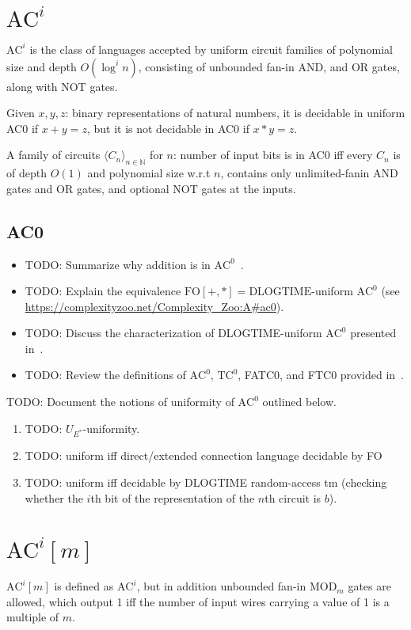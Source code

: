 \section{\texorpdfstring{$\text{AC}^i$}{AC\string^i}}
$\text{AC}^i$ is the class of languages accepted by uniform circuit
families of polynomial size and depth $O(\log^i n)$, consisting of unbounded fan-in
AND, and OR gates, along with NOT gates.

Given $x, y, z$: binary representations of natural numbers,
it is decidable in uniform AC0 if $x + y = z$, but it is not decidable 
in AC0 if $x * y = z$.

A family of circuits $\langle C_n \rangle_{n \in \mathbb{N}}$ for $n$:
number of input bits is in AC0 iff every $C_n$ is of depth $O(1)$ and polynomial 
size w.r.t $n$, contains only unlimited-fanin AND gates and OR gates, and optional 
NOT gates at the inputs. 

\subsection{AC0}
\begin{itemize}
\item TODO: Summarize why addition is in $\text{AC}^0$~\cite{BussLectureNotes}.
\item TODO: Explain the equivalence $\text{FO}[+, *] = \text{DLOGTIME}$-uniform $\text{AC}^0$ (see \url{https://complexityzoo.net/Complexity_Zoo:A#ac0}).
\item TODO: Discuss the characterization of DLOGTIME-uniform $\text{AC}^0$ presented in~\cite{hella2023regularrepresentationsuniformtc0}.
\item TODO: Review the definitions of $\text{AC}^0$, $\text{TC}^0$, FATC0, and FTC0 provided in~\cite{612309}.
\end{itemize}
TODO: Document the notions of uniformity of $\text{AC}^0$ outlined below.
\begin{enumerate}
\item TODO: $U_{E^*}$-uniformity.
\item TODO: uniform iff direct/extended connection language decidable by FO 
\item TODO: uniform iff decidable by DLOGTIME random-access tm (checking whether the $i$th bit of the representation of the $n$th circuit is $b$).
\end{enumerate}



\section{\texorpdfstring{$\text{AC}^i[m]$}{AC\string^i[m]}}
$\text{AC}^i[m]$ is defined as $\text{AC}^i$, but in addition unbounded fan-in $\text{MOD}_m$ gates
are allowed, which output 1 iff the number of input wires carrying a value of 1 is a
multiple of $m$.

